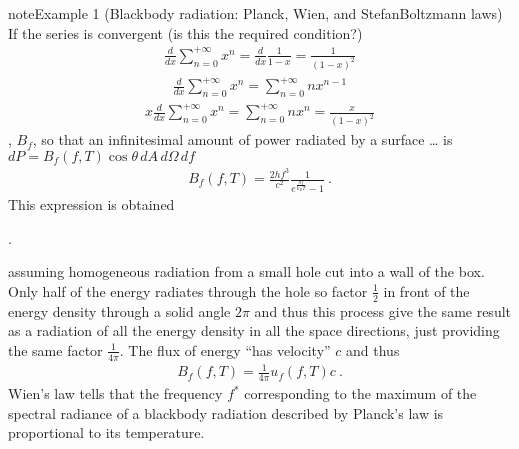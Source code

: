 \documentclass[letterpaper,10pt,english]{jupyterBook}
\begin{document}
\begin{sphinxadmonition}{note}{Example 1 (Black\sphinxhyphen{}body radiation: Planck, Wien, and Stefan\sphinxhyphen{}Boltzmann laws)}
\begin{equation*}
\end{equation*}
\sphinxAtStartPar
{} If the series is convergent (is this the required condition?)
\begin{equation*}
\begin{split}\frac{d}{d x} \sum_{n=0}^{+\infty} x^n = \frac{d}{dx} \frac{1}{1 - x} = \frac{1}{(1-x)^2}\end{split}
\end{equation*}\begin{equation*}
\begin{split}\frac{d}{d x} \sum_{n=0}^{+\infty} x^n = \sum_{n=0}^{+\infty} n x^{n-1}\end{split}
\end{equation*}\begin{equation*}
\begin{split}x \frac{d}{d x} \sum_{n=0}^{+\infty} x^n = \sum_{n=0}^{+\infty} n x^n = \frac{x}{(1-x)^2}\end{split}
\end{equation*}
\sphinxAtStartPar
{}, \(B_{f}\), so that an infinitesimal amount of power radiated by a surface … is \(d P = B_f(f,T) \cos \theta \, dA \, d\Omega \, d f\)
\begin{equation*}
\begin{split}B_{f}(f, T) = \frac{2 h f^3}{c^2}\frac{1}{e^{\frac{hf}{k_B T}} - 1} \ .\end{split}
\end{equation*}
\sphinxAtStartPar
This expression is obtained%
\begin{footnote}[1]\sphinxAtStartFootnote
{}.
%
\end{footnote} assuming homogeneous radiation from a small hole cut into a wall of the box. Only half of the energy radiates through the hole \sphinxhyphen{} so factor \(\frac{1}{2}\) in front of the energy density \sphinxhyphen{} through a solid angle \(2 \pi\) \sphinxhyphen{} and thus this process give the same result as a radiation of all the energy density in all the space directions, just providing the same factor \(\frac{1}{4 \pi}\). The flux of energy “has velocity” \(c\) and thus
\begin{equation*}
\begin{split}B_{f}(f, T) = \frac{1}{4 \pi} u_{f}(f,T) c \ .\end{split}
\end{equation*}
\sphinxAtStartPar
{} Wien’s law tells that the frequency \(f^*\) corresponding to the maximum of the spectral radiance of a black\sphinxhyphen{}body radiation described by Planck’s law is proportional to its temperature.


\end{sphinxadmonition}
\end{document}
